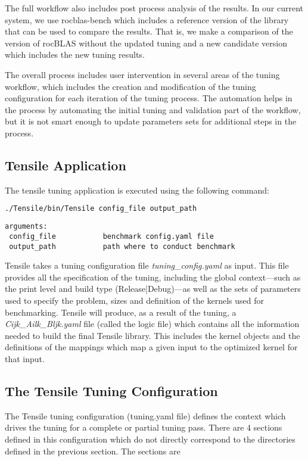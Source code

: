 \documentclass[]{article}
\begin{document}
The full workflow also includes post process analysis of the results. In our current system, we use rocblas-bench which includes a reference version of the library that can be used to compare the results. That is, we make a comparison of the version of rocBLAS without the updated tuning and a new candidate version which includes the new tuning results.

The overall process includes user intervention in several areas of the tuning workflow, which includes the creation and modification of the tuning configuration for each iteration of the tuning process. The automation helps in the process by automating the initial tuning and validation part of the workflow, but it is not smart enough to update parameters sets for additional steps in the process.

\subsection{Tensile Application}
The tensile tuning application is executed using the following command:

\begin{lstlisting}[language=bash]
./Tensile/bin/Tensile config_file output_path
\end{lstlisting}

\begin{verbatim}
arguments: 
 config_file           benchmark config.yaml file
 output_path           path where to conduct benchmark
\end{verbatim}

Tensile takes a tuning configuration file \emph{tuning\_config.yaml} as input. This file provides all the specification of the tuning, including the global context---such as the print level and build type (Release|Debug)---as well as the sets of parameters used to specify the problem, sizes and definition of the kernels used for benchmarking. Tensile will produce, as a result of the tuning, a \emph{Cijk\_Ailk\_Bljk.yaml} file (called the logic file) which contains all the information needed to build the final Tensile library. This includes the kernel objects and the definitions of the mappings which map a given input to the optimized kernel for that input.


\subsection{The Tensile Tuning Configuration}

The Tensile tuning configuration (tuning.yaml file) defines the context which drives the tuning for a complete or partial tuning pass. There are 4 sections defined in this configuration which do not directly correspond to the directories defined in the previous section. The sections are 
\end{document}

